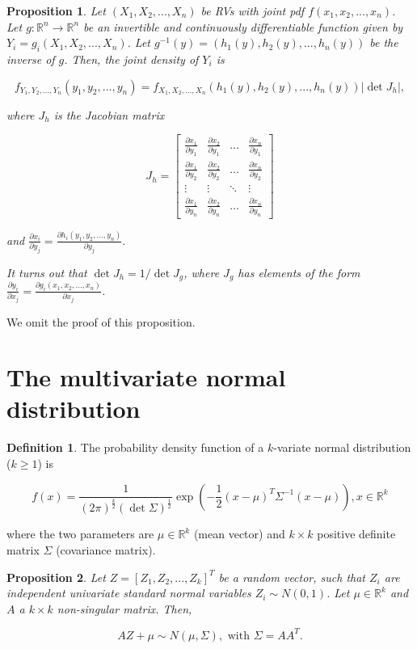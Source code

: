 \documentclass{book}
\theoremstyle{plain}%
\newtheorem{proposition}{Proposition}[section]
\theoremstyle{definition}
\newtheorem{definition}{Definition}[section]
\newlength{\arrow}
\newcommand{\pder}[2]{\frac{\partial #1}{\partial #2}}
\begin{document}
\begin{proposition}
Let $(X_1,X_2,...,X_n)$ be RVs with joint pdf $f(x_1,x_2,...,x_n)$. Let $g: \mathbb{R}^n \rightarrow \mathbb{R}^n$ be an invertible and continuously differentiable function given by $Y_i = g_i(X_1, X_2, ..., X_n)$. Let $g^{-1}(y) = (h_1(y), h_2(y),..., h_n(y))$ be the inverse of $g$. Then, the joint density of $Y_i$ is

$$f_{Y_1,Y_2,...,Y_n}(y_1,y_2,...,y_n) = f_{X_1,X_2,...,X_n}(h_1(y), h_2(y),..., h_n(y))|\det J_h|,$$

where $J_h$ is the Jacobian matrix

$$J_h = \begin{bmatrix}
\pder{x_1}{y_1} & \pder{x_2}{y_1} & \dots & \pder{x_n}{y_1} \\[1ex]
\pder{x_1}{y_2} & \pder{x_2}{y_2} & \dots & \pder{x_n}{y_2} \\
\vdots & \vdots & \ddots & \vdots \\[1ex]
\pder{x_1}{y_n} & \pder{x_2}{y_n} & \dots & \pder{x_n}{y_n}
\end{bmatrix}$$

and $\pder{x_i}{y_j} = \pder{h_i(y_1,y_2,...,y_n)}{y_j}.$

It turns out that $\det J_h = 1/\det J_g$, where $J_g$ has elements of the form $\pder{y_i}{x_j} = \pder{g_i(x_1,x_2,...,x_n)}{x_j}$.\label{prop:changeofvar}
\end{proposition}

We omit the proof of this proposition.

\section{The multivariate normal distribution}

\begin{definition}
The probability density function of a $k$-variate normal distribution ($k \geq 1$) is

$$f(x) = \frac{1}{(2\pi)^\frac{k}{2}(\det\Sigma)^\frac{1}{2}} \exp\left(-\frac{1}{2}(x-\mu)^T\Sigma^{-1}(x - \mu)\right), x \in \mathbb{R}^k$$

where the two parameters are $\mu \in \mathbb{R}^k$ (mean vector) and $k \times k$ positive definite matrix $\Sigma$ (covariance matrix).
\end{definition}

\begin{proposition}
Let $Z = [Z_1, Z_2,...,Z_k]^T$ be a random vector, such that $Z_i$ are independent univariate standard normal variables $Z_i \sim N(0,1)$. Let $\mu \in \mathbb{R}^k$ and $A$ a $k \times k$ non-singular matrix. Then,

$$AZ + \mu \sim N(\mu, \Sigma), \text{ with } \Sigma = AA^T.$$
\end{proposition}
\end{document}

